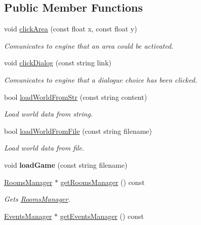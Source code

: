 \subsection*{Public Member Functions}
\begin{DoxyCompactItemize}
\item 
void \hyperlink{classEngine_a936b01c9f34d9823777579437fc74b07}{clickArea} (const float x, const float y)
\begin{DoxyCompactList}\small\item\em Comunicates to engine that an area could be activated. \item\end{DoxyCompactList}\item 
void \hyperlink{classEngine_a0293884bc7150e040adf89a0ef9214b3}{clickDialog} (const string link)
\begin{DoxyCompactList}\small\item\em Comunicates to engine that a dialogue choice has been clicked. \item\end{DoxyCompactList}\item 
bool \hyperlink{classEngine_af730651bd09d0395d6938ee2b48e5301}{loadWorldFromStr} (const string content)
\begin{DoxyCompactList}\small\item\em Load world data from string. \item\end{DoxyCompactList}\item 
bool \hyperlink{classEngine_adf036b1c5af70e621bed4b09074897d1}{loadWorldFromFile} (const string filename)
\begin{DoxyCompactList}\small\item\em Load world data from file. \item\end{DoxyCompactList}\item 
\hypertarget{classEngine_a95d1912da54b5100c82fbf7fe2f0ddf2}{
void {\bfseries loadGame} (const string filename)}
\label{classEngine_a95d1912da54b5100c82fbf7fe2f0ddf2}

\item 
\hypertarget{classEngine_a297b7233ad04707bf90d7cbc2cbfb117}{
\hyperlink{classRoomsManager}{RoomsManager} $\ast$ \hyperlink{classEngine_a297b7233ad04707bf90d7cbc2cbfb117}{getRoomsManager} () const }
\label{classEngine_a297b7233ad04707bf90d7cbc2cbfb117}

\begin{DoxyCompactList}\small\item\em Gets \hyperlink{classRoomsManager}{RoomsManager}. \item\end{DoxyCompactList}\item 
\hypertarget{classEngine_a32274087fb61b8ec5daeccf068c2909f}{
\hyperlink{classEventsManager}{EventsManager} $\ast$ \hyperlink{classEngine_a32274087fb61b8ec5daeccf068c2909f}{getEventsManager} () const }
\label{classEngine_a32274087fb61b8ec5daeccf068c2909f}


\end{DoxyCompactItemize}
